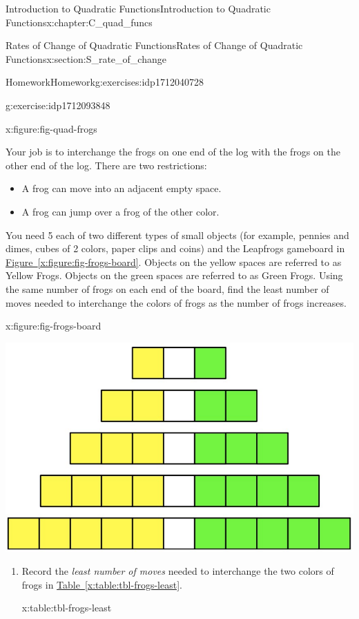 \documentclass[oneside,10pt,]{book}
\newcommand{\xreffont}{\relax}
\numberwithin{equation}{chapter}
\begin{document}
\begin{chapterptx}{Introduction to Quadratic Functions}{}{Introduction to Quadratic Functions}{}{}{x:chapter:C_quad_funcs}
\begin{sectionptx}{Rates of Change of Quadratic Functions}{}{Rates of Change of Quadratic Functions}{}{}{x:section:S_rate_of_change}
\begin{exercises-subsection}{Homework}{}{Homework}{}{}{g:exercises:idp1712040728}
\begin{divisionexercise}{3}{}{}{g:exercise:idp1712093848}
\begin{figureptx}{}{x:figure:fig-quad-frogs}{}
\begin{image}{0.05}{0.9}{0.05}
\end{image}%
\tcblower
\end{figureptx}%
Your job is to interchange the frogs on one end of the log with the frogs on the other end of the log. There are two restrictions:%
\begin{itemize}[label=\textbullet]
\item{}A frog can move into an adjacent empty space.%
\item{}A frog can jump over a frog of the other color.%
\end{itemize}
You need 5 each of two different types of small objects (for example, pennies and dimes, cubes of 2 colors, paper clips and coins) and the Leapfrogs gameboard in \hyperref[x:figure:fig-frogs-board]{Figure~{\xreffont\ref{x:figure:fig-frogs-board}}}. Objects on the yellow spaces are referred to as Yellow Frogs. Objects on the green spaces are referred to as Green Frogs. Using the same number of frogs on each end of the board, find the least number of moves needed to interchange the colors of frogs as the number of frogs increases.%
\begin{figureptx}{}{x:figure:fig-frogs-board}{}%
\begin{image}{0.15}{0.7}{0.15}%
\includegraphics[width=\linewidth]{external/frogs-board.pdf}
\end{image}%
\tcblower
\end{figureptx}%
\begin{enumerate}[font=\bfseries,label=(\alph*),ref=\alph*]
\item{}Record the \emph{least number of moves} needed to interchange the two colors of frogs in \hyperref[x:table:tbl-frogs-least]{Table~{\xreffont\ref{x:table:tbl-frogs-least}}}.%
\begin{tableptx}{\textbf{}}{x:table:tbl-frogs-least}{}%

\end{tableptx}
\end{enumerate}
\end{divisionexercise}
\end{exercises-subsection}
\end{sectionptx}
\end{chapterptx}
\end{document}
